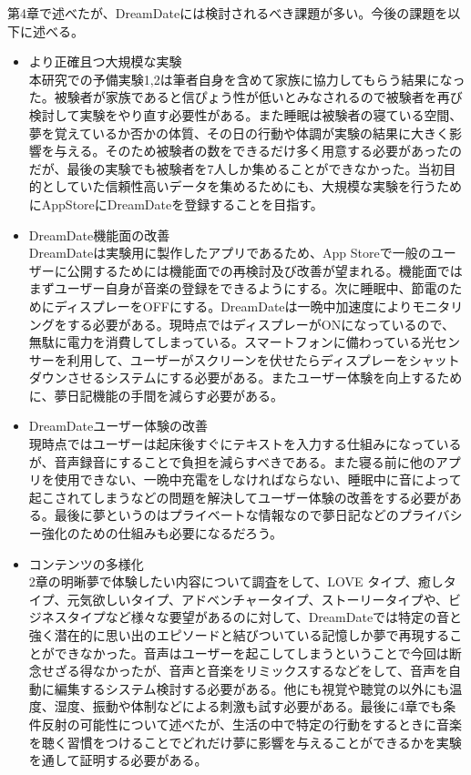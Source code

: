 第4章で述べたが、DreamDateには検討されるべき課題が多い。今後の課題を以下に述べる。

\begin{itemize}
\item より正確且つ大規模な実験\\
本研究での予備実験1,2は筆者自身を含めて家族に協力してもらう結果になった。被験者が家族であると信ぴょう性が低いとみなされるので被験者を再び検討して実験をやり直す必要性がある。また睡眠は被験者の寝ている空間、夢を覚えているか否かの体質、その日の行動や体調が実験の結果に大きく影響を与える。そのため被験者の数をできるだけ多く用意する必要があったのだが、最後の実験でも被験者を7人しか集めることができなかった。当初目的としていた信頼性高いデータを集めるためにも、大規模な実験を行うためにAppStoreにDreamDateを登録することを目指す。\\

\item DreamDate機能面の改善\\
DreamDateは実験用に製作したアプリであるため、App Storeで一般のユーザーに公開するためには機能面での再検討及び改善が望まれる。機能面ではまずユーザー自身が音楽の登録をできるようにする。次に睡眠中、節電のためにディスプレーをOFFにする。DreamDateは一晩中加速度によりモニタリングをする必要がある。現時点ではディスプレーがONになっているので、無駄に電力を消費してしまっている。スマートフォンに備わっている光センサーを利用して、ユーザーがスクリーンを伏せたらディスプレーをシャットダウンさせるシステムにする必要がある。またユーザー体験を向上するために、夢日記機能の手間を減らす必要がある。\\

\item DreamDateユーザー体験の改善\\
現時点ではユーザーは起床後すぐにテキストを入力する仕組みになっているが、音声録音にすることで負担を減らすべきである。また寝る前に他のアプリを使用できない、一晩中充電をしなければならない、睡眠中に音によって起こされてしまうなどの問題を解決してユーザー体験の改善をする必要がある。最後に夢というのはプライベートな情報なので夢日記などのプライバシー強化のための仕組みも必要になるだろう。\\

\item コンテンツの多様化\\
2章の明晰夢で体験したい内容について調査をして、LOVE タイプ、癒しタイプ、元気欲しいタイプ、アドベンチャータイプ、ストーリータイプや、ビジネスタイプなど様々な要望があるのに対して、DreamDateでは特定の音と強く潜在的に思い出のエピソードと結びついている記憶しか夢で再現することができなかった。音声はユーザーを起こしてしまうということで今回は断念せざる得なかったが、音声と音楽をリミックスするなどをして、音声を自動に編集するシステム検討する必要がある。他にも視覚や聴覚の以外にも温度、湿度、振動や体制などによる刺激も試す必要がある。最後に4章でも条件反射の可能性について述べたが、生活の中で特定の行動をするときに音楽を聴く習慣をつけることでどれだけ夢に影響を与えることができるかを実験を通して証明する必要がある。\\


\end{itemize}
